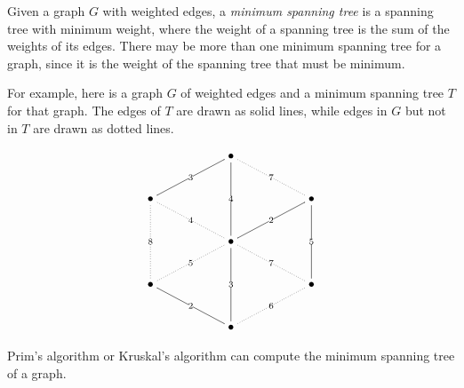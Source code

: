 \documentclass[12pt]{article}
\begin{document}
Given a graph $G$ with weighted edges, a \emph{minimum spanning tree} is a spanning tree with minimum weight, where the weight of a spanning tree is the sum of the weights of its edges.  There may be more than one minimum spanning tree for a graph, since it is the weight of the spanning tree that must be minimum.

For example, here is a graph $G$ of weighted edges and a minimum spanning tree $T$ for that graph.  The edges of $T$ are drawn as solid lines, while edges in $G$ but not in $T$ are drawn as dotted lines.

$$
\xymatrix{
&&\bullet\ar@{-}[dll]|3\ar@{-}[dd]|4\ar@{.}[drr]|7 \\
\bullet\ar@{.}[dd]|8\ar@{.}[drr]|4&&&&\bullet\ar@{-}[dll]|2\ar@{-}[dd]|5 \\
&&\bullet\ar@{.}[dll]|5\ar@{-}[dd]|3\ar@{.}[drr]|7 \\
\bullet\ar@{-}[drr]|2&&&&\bullet\ar@{.}[dll]|6 \\
&&\bullet
}
$$

Prim's algorithm or Kruskal's algorithm can compute the minimum spanning tree of a graph.
\end{document}
